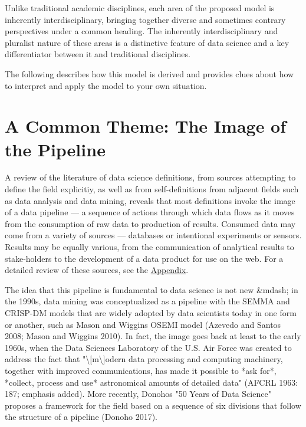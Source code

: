 \documentclass[
  letterpaper,
  DIV=11,
  numbers=noendperiod]{scrreprt}
\newenvironment{Shaded}{\begin{snugshade}}{\end{snugshade}}
\newcommand{\NormalTok}[1]{\textcolor[rgb]{0.00,0.23,0.31}{#1}}
\begin{document}
Unlike traditional academic disciplines, each area of the proposed model
is inherently interdisciplinary, bringing together diverse and sometimes
contrary perspectives under a common heading. The inherently
interdisciplinary and pluralist nature of these areas is a distinctive
feature of data science and a key differentiator between it and
traditional disciplines.

The following describes how this model is derived and provides clues
about how to interpret and apply the model to your own situation.

\hypertarget{a-common-theme-the-image-of-the-pipeline}{%
\section{A Common Theme: The Image of the
Pipeline}\label{a-common-theme-the-image-of-the-pipeline}}

A review of the literature of data science definitions, from sources
attempting to define the field explicitiy, as well as from
self-definitions from adjacent fields such as data analysis and data
mining, reveals that most definitions invoke the image of a data
pipeline --- a sequence of actions through which data flows as it moves
from the consumption of raw data to production of results. Consumed data
may come from a variety of sources --- databases or intentional
experiments or sensors. Results may be equally various, from the
communication of analytical results to stake-holders to the development
of a data product for use on the web. For a detailed review of these
sources, see the \href{pipeline-sources.md}{Appendix}.

\begin{Shaded}
\begin{Highlighting}[]
\NormalTok{The idea that this pipeline is fundamental to data science is not new \&mdash; in the 1990s, data mining was conceptualized as a pipeline with the SEMMA and CRISP{-}DM models that are widely adopted by data scientists today in one form or another, such as Mason and Wiggins\textquotesingle{} OSEMI model (Azevedo and Santos 2008; Mason and Wiggins 2010). In fact, the image goes back at least to the early 1960s, when the Data Sciences Laboratory of the U.S. Air Force was created to address the fact that "\textbackslash{}[m\textbackslash{}]odern data processing and computing machinery, together with improved communications, has made it possible to *ask for*, *collect, process and use* astronomical amounts of detailed data" (AFCRL 1963: 187; emphasis added). More recently, Donoho\textquotesingle{}s "50 Years of Data Science" proposes a framework for the field based on a sequence of six divisions that follow the structure of a pipeline (Donoho 2017).}
\end{Highlighting}
\end{Shaded}
\end{document}
